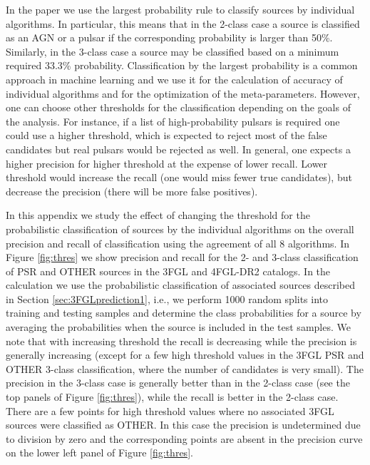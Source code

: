 \documentclass{aa}
\begin{document}
\begin{appendix}
In the paper we use the largest probability rule to classify sources by individual algorithms.
In particular, this means that in the 2-class case a source is classified as an AGN or a pulsar if the corresponding probability
is larger than 50\%. Similarly, in the 3-class case a source may be classified based on a minimum required 33.3\% probability.
Classification by the largest probability is a common approach in machine learning and we use it
for the calculation of accuracy of individual algorithms and for the optimization of the meta-parameters. 
However, one can choose other thresholds for the classification depending on the goals of the analysis.
For instance, if a list of high-probability pulsars is required one could use a higher threshold, 
which is expected to reject most of the false candidates but real pulsars would be rejected as well. 
In general, one expects a higher precision for higher threshold
at the expense of lower recall.
Lower threshold would increase the recall (one would miss fewer true candidates), 
but decrease the precision (there will be more false positives).



In this appendix we study the effect of changing the threshold for the probabilistic classification of sources by the individual
algorithms on the overall precision and recall of classification using the agreement of all 8 algorithms.
In Figure \ref{fig:thres} we show precision and recall for the 2- and 3-class classification of PSR and OTHER sources in the 3FGL and 4FGL-DR2 catalogs.
In the calculation we use the probabilistic classification of associated sources described in Section \ref{sec:3FGLprediction1},
i.e., we perform 1000 random splits into training and testing samples and determine the class probabilities for a source by averaging the probabilities when the source is included in the test samples.
We note that with increasing threshold the recall is decreasing while the precision is generally increasing  (except for a few high threshold values in the 3FGL PSR and OTHER 3-class classification, where the number of candidates is very small).
The precision in the 3-class case is generally better than in the 2-class case (see the top panels of Figure \ref{fig:thres}),
while the recall is better in the 2-class case.
There are a few points for high threshold values where no associated 3FGL sources were classified as OTHER.
In this case the precision is undetermined due to division by zero and the corresponding points are absent in the precision curve
on the lower left panel of Figure \ref{fig:thres}.



\end{appendix}
\end{document}

